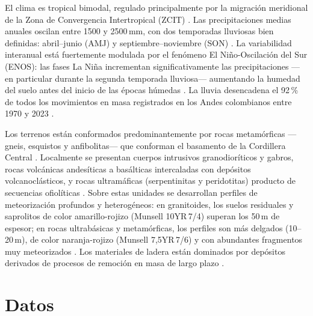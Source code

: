 \documentclass[10pt, twocolumn, letterpaper]{article}
\begin{document}
El clima es tropical bimodal, regulado principalmente por la migración
meridional de la Zona de Convergencia Intertropical (ZCIT) \cite{bedoya2019,
aristizabal2026, poveda2011}. Las precipitaciones medias anuales oscilan entre
1500 y 2500\,mm, con dos temporadas lluviosas bien definidas: abril--junio
(AMJ) y septiembre--noviembre (SON) \cite{bedoya2019, aristizabal2026}. La
variabilidad interanual está fuertemente modulada por el fenómeno El
Niño-Oscilación del Sur (ENOS): las fases La Niña incrementan
significativamente las precipitaciones ---en particular durante la segunda
temporada lluviosa--- aumentando la humedad del suelo antes del inicio de las
épocas húmedas \cite{aristizabal2026, poveda2011}. La lluvia desencadena el
92\,\% de todos los movimientos en masa registrados en los Andes colombianos
entre 1970 y 2023 \cite{aristizabal2020}.

Los terrenos están conformados predominantemente por rocas metamórficas
---gneis, esquistos y anfibolitas--- que conforman el basamento de la Cordillera
Central \cite{cediel2003}. Localmente se presentan
cuerpos intrusivos granodioríticos y gabros, rocas volcánicas andesíticas a
basálticas intercaladas con depósitos volcanoclásticos, y rocas ultramáficas
(serpentinitas y peridotitas) producto de secuencias ofiolíticas \cite{cediel2003}.
Sobre estas unidades se desarrollan perfiles de meteorización profundos y
heterogéneos: en granitoides, los suelos residuales y saprolitos de color
amarillo-rojizo (Munsell 10YR\,7/4) superan
los 50\,m de espesor;
en rocas ultrabásicas y metamórficas, los perfiles son más delgados
(10--20\,m), de color naranja-rojizo (Munsell 7,5YR\,7/6) y con abundantes
fragmentos muy meteorizados \cite{aristizabal2005, aristizabal2025}. Los
materiales de ladera están dominados por depósitos derivados de procesos de
remoción en masa de largo plazo \cite{aristizabal2005}.

\section{Datos}
\label{sec:data}
\end{document}
